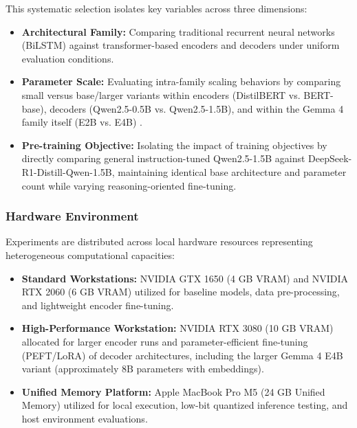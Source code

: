 \documentclass[conference]{IEEEtran}
\begin{document}
This systematic selection isolates key variables across three dimensions:
\begin{itemize}
    \item \textbf{Architectural Family:} Comparing traditional recurrent neural networks (BiLSTM) against transformer-based encoders and decoders under uniform evaluation conditions.
    \item \textbf{Parameter Scale:} Evaluating intra-family scaling behaviors by comparing small versus base/larger variants within encoders (DistilBERT vs. BERT-base), decoders (Qwen2.5-0.5B vs. Qwen2.5-1.5B), and within the Gemma 4 family itself (E2B vs. E4B) \cite{gemmateam2026gemma4}.
    \item \textbf{Pre-training Objective:} Isolating the impact of training objectives by directly comparing general instruction-tuned Qwen2.5-1.5B against DeepSeek-R1-Distill-Qwen-1.5B, maintaining identical base architecture and parameter count while varying reasoning-oriented fine-tuning.
\end{itemize}

\subsubsection{Hardware Environment}
Experiments are distributed across local hardware resources representing heterogeneous computational capacities:
\begin{itemize}
    \item \textbf{Standard Workstations:} NVIDIA GTX 1650 (4 GB VRAM) and NVIDIA RTX 2060 (6 GB VRAM) utilized for baseline models, data pre-processing, and lightweight encoder fine-tuning.
    \item \textbf{High-Performance Workstation:} NVIDIA RTX 3080 (10 GB VRAM) allocated for larger encoder runs and parameter-efficient fine-tuning (PEFT/LoRA) of decoder architectures, including the larger Gemma 4 E4B variant (approximately $8\text{B}$ parameters with embeddings).
    \item \textbf{Unified Memory Platform:} Apple MacBook Pro M5 (24 GB Unified Memory) utilized for local execution, low-bit quantized inference testing, and host environment evaluations.
\end{itemize}
\end{document}
